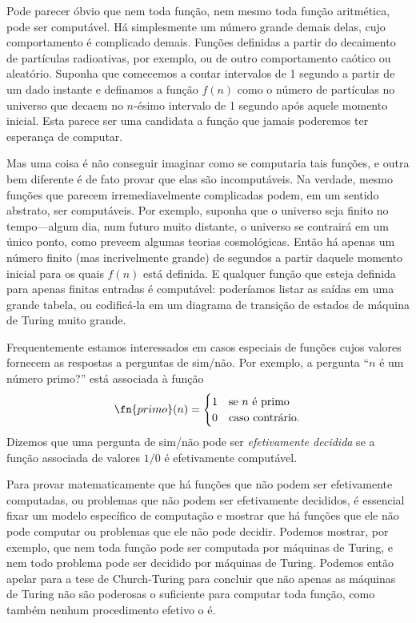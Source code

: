 \documentclass[../../../include/open-logic-section]{subfiles}
\begin{document}

Pode parecer óbvio que nem toda função, nem mesmo toda função
aritmética, pode ser computável. Há simplesmente um número grande
demais delas, cujo comportamento é complicado demais. Funções
definidas a partir do decaimento de partículas radioativas, por
exemplo, ou de outro comportamento caótico ou aleatório. Suponha que
comecemos a contar intervalos de 1 segundo a partir de um dado
instante e definamos a função $f(n)$ como o número de partículas no
universo que decaem no $n$-ésimo intervalo de 1 segundo após aquele
momento inicial. Esta parece ser uma candidata a função que jamais
poderemos ter esperança de computar.

Mas uma coisa é não conseguir imaginar como se computaria tais
funções, e outra bem diferente é de fato provar que elas são
incomputáveis. Na verdade, mesmo funções que parecem irremediavelmente
complicadas podem, em um sentido abstrato, ser computáveis. Por
exemplo, suponha que o universo seja finito no tempo---algum dia, num
futuro muito distante, o universo se contrairá em um único ponto, como
preveem algumas teorias cosmológicas. Então há apenas um número finito
(mas incrivelmente grande) de segundos a partir daquele momento
inicial para os quais $f(n)$ está definida. E qualquer função que
esteja definida para apenas finitas entradas é computável: poderíamos
listar as saídas em uma grande tabela, ou codificá-la em um diagrama
de transição de estados de máquina de Turing muito grande.

Frequentemente estamos interessados em casos especiais de funções
cujos valores fornecem as respostas a perguntas de sim/não. Por
exemplo, a pergunta ``$n$ é um número primo?'' está associada à função
\[
\fn{primo}(n) = \begin{cases}
  1 & \text{se $n$ é primo}\\
  0 & \text{caso contrário.}
  \end{cases}
\]
Dizemos que uma pergunta de sim/não pode ser \emph{efetivamente
decidida} se a função associada de valores $1/0$ é efetivamente
computável.

Para provar matematicamente que há funções que não podem ser
efetivamente computadas, ou problemas que não podem ser efetivamente
decididos, é essencial fixar um modelo específico de computação e
mostrar que há funções que ele não pode computar ou problemas que ele
não pode decidir. Podemos mostrar, por exemplo, que nem toda função
pode ser computada por máquinas de Turing, e nem todo problema pode ser
decidido por máquinas de Turing. Podemos então apelar para a tese de
Church-Turing para concluir que não apenas as máquinas de Turing não
são poderosas o suficiente para computar toda função, como também
nenhum procedimento efetivo o é.
\end{document}
